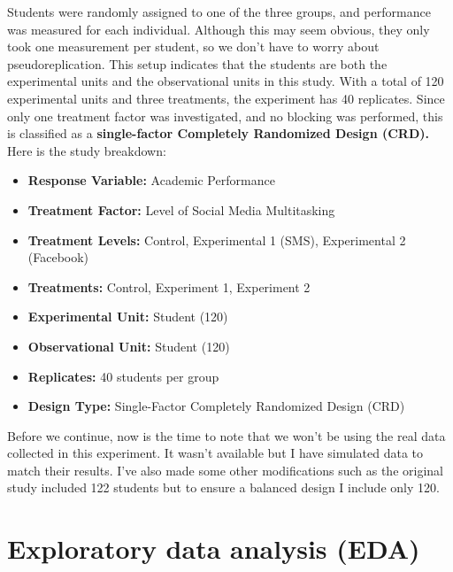 \documentclass[
  letterpaper,
]{book}
\providecommand{\tightlist}{%
  \setlength{\itemsep}{0pt}\setlength{\parskip}{0pt}}\usepackage{longtable,booktabs,array}
\begin{document}
Students were randomly assigned to one of the three groups, and
performance was measured for each individual. Although this may seem
obvious, they only took one measurement per student, so we don't have to
worry about pseudoreplication. This setup indicates that the students
are both the experimental units and the observational units in this
study. With a total of 120 experimental units and three treatments, the
experiment has 40 replicates. Since only one treatment factor was
investigated, and no blocking was performed, this is classified as a
\textbf{single-factor Completely Randomized Design (CRD).} Here is the
study breakdown:

\begin{itemize}
\tightlist
\item
  \textbf{Response Variable:} Academic Performance\\
\item
  \textbf{Treatment Factor:} Level of Social Media Multitasking\\
\item
  \textbf{Treatment Levels:} Control, Experimental 1 (SMS), Experimental
  2 (Facebook)\\
\item
  \textbf{Treatments:} Control, Experiment 1, Experiment 2\\
\item
  \textbf{Experimental Unit:} Student (120)\\
\item
  \textbf{Observational Unit:} Student (120)\\
\item
  \textbf{Replicates:} 40 students per group\\
\item
  \textbf{Design Type:} Single-Factor Completely Randomized Design (CRD)
\end{itemize}

Before we continue, now is the time to note that we won't be using the
real data collected in this experiment. It wasn't available but I have
simulated data to match their results. I've also made some other
modifications such as the original study included 122 students but to
ensure a balanced design I include only 120.

\section{Exploratory data analysis
(EDA)}\label{exploratory-data-analysis-eda}
\end{document}
